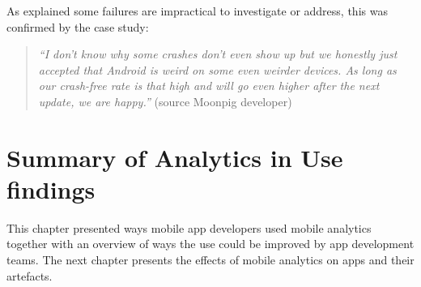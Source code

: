 As  explained some failures are impractical to investigate or address, this was confirmed by the  case study:

\begin{quote}
    \emph{``I don't know why some crashes don't even show up but we honestly just accepted that Android is weird on some even weirder devices. As long as our crash-free rate is that high and will go even higher after the next update, we are happy.''} (source Moonpig developer)
\end{quote}

\section{Summary of Analytics in Use findings}
This chapter presented ways mobile app developers used mobile analytics together with an overview of ways the use could be improved by app development teams. The next chapter presents the effects of mobile analytics on apps and their artefacts.

